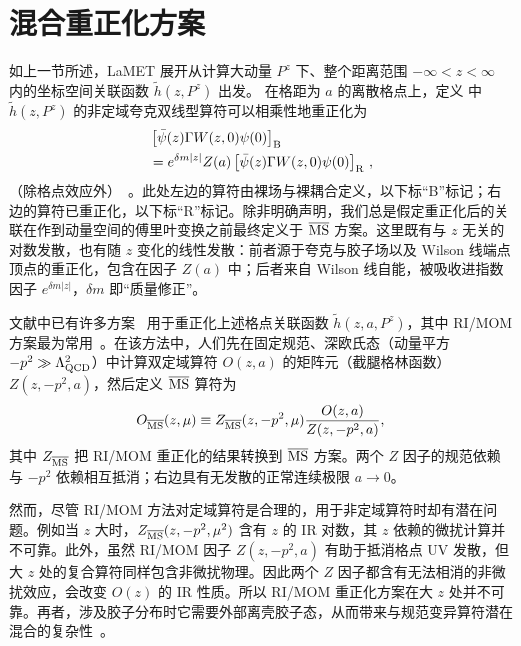 \section{混合重正化方案}
\label{sec:hybrid}

如上一节所述，LaMET 展开从计算大动量 $P^z$ 下、整个距离范围
$-\infty<z<\infty$ 内的坐标空间关联函数 $\tilde h(z,P^z)$ 出发。
在格距为 $a$ 的离散格点上，定义  中 $\tilde h(z,P^z)$ 的非定域夸克双线型算符可以相乘性地重正化为~\cite{Ji:2017oey,Ishikawa:2017faj,Green:2017xeu}
\begin{align}\label{eq:ren}
&\left[\bar{\psi}(z)\Gamma W(z,0)\psi(0)\right]_{\rm B} \nonumber\\
&= e^{\delta m|z|}Z(a) \left[\bar{\psi}(z)\Gamma W(z,0)\psi(0)\right]_{\rm R}\,,
\end{align}
（除格点效应外）~\cite{Constantinou:2017sej,Chen:2017mie}。此处左边的算符由裸场与裸耦合定义，以下标``B''标记；右边的算符已重正化，以下标``R''标记。除非明确声明，我们总是假定重正化后的关联在作到动量空间的傅里叶变换之前最终定义于 ${\overline{\rm MS}}$ 方案。这里既有与 $z$ 无关的对数发散，也有随 $z$ 变化的线性发散：前者源于夸克与胶子场以及 Wilson 线端点顶点的重正化，包含在因子 $Z(a)$ 中；后者来自 Wilson 线自能，被吸收进指数因子 $e^{\delta m|z|}$，$\delta m$ 即``质量修正''。

文献中已有许多方案~\cite{Ishikawa:2016znu,Chen:2016fxx,Monahan:2016bvm,Radyushkin:2017cyf,Constantinou:2017sej,Green:2017xeu,Stewart:2017tvs,Braun:2018brg,Li:2020xml} 用于重正化上述格点关联函数 $\tilde h(z, a, P^z)$，其中 RI/MOM 方案最为常用~\cite{Constantinou:2017sej,Stewart:2017tvs}。在该方法中，人们先在固定规范、深欧氏态（动量平方 $-p^2\gg\Lambda_{\rm QCD}^2$）中计算双定域算符 $O(z,a)$ 的矩阵元（截腿格林函数）$Z(z,-p^2,a)$，然后定义 $\overline{\rm MS}$ 算符为
\begin{align}
             O_{\overline{\rm MS}}(z,\mu) \equiv Z_{\overline{\rm MS}}(z,-p^2,\mu)\frac{O(z,a)}{Z(z,-p^2,a)},
\end{align}
其中 $Z_{\overline{\rm MS}}$ 把 RI/MOM 重正化的结果转换到 $\overline{\rm MS}$ 方案。两个 $Z$ 因子的规范依赖与 $-p^2$ 依赖相互抵消；右边具有无发散的正常连续极限 $a\to 0$。

然而，尽管 RI/MOM 方法对定域算符是合理的，用于非定域算符时却有潜在问题。例如当 $z$ 大时，$Z_{\overline{\rm MS}}(z,-p^2,\mu^2)$ 含有 $z$ 的 IR 对数，其 $z$ 依赖的微扰计算并不可靠。此外，虽然 RI/MOM 因子 $Z(z,-p^2,a)$ 有助于抵消格点 UV 发散，但大 $z$ 处的复合算符同样包含非微扰物理。因此两个 $Z$ 因子都含有无法相消的非微扰效应，会改变 $O(z)$ 的 IR 性质。所以 RI/MOM 重正化方案在大 $z$ 处并不可靠。再者，涉及胶子分布时它需要外部离壳胶子态，从而带来与规范变异算符潜在混合的复杂性~\cite{Wang:2019tgg}。

